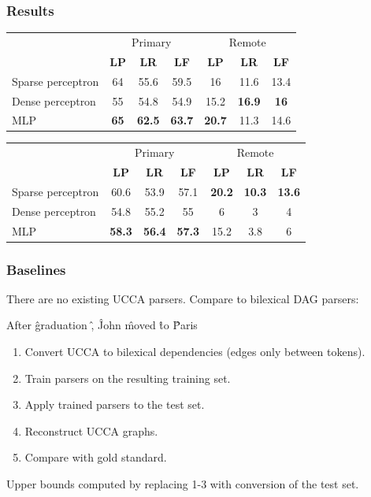 \documentclass[t]{beamer}
\begin{document}
\begin{frame}
\frametitle{Results}
\begin{center}
	\begin{tabular}{l|ccc|ccc}
	& \multicolumn{3}{c|}{Primary} & \multicolumn{3}{c}{Remote} \\
	& \textbf{LP} & \textbf{LR} & \textbf{LF} & \textbf{LP} & \textbf{LR} & \textbf{LF} \\
	\hline
	Sparse perceptron
	& 64 & 55.6 & 59.5 & 16 & 11.6 & 13.4 \\
	Dense perceptron
	& 55 & 54.8 & 54.9 & 15.2 & \bf 16.9 & \bf 16 \\
	MLP
	& \bf 65 & \bf 62.5 & \bf 63.7 & \bf 20.7 & 11.3 & 14.6
	\end{tabular}
	
	\vfill
	\pause
	\begin{tabular}{l|ccc|ccc}
	& \multicolumn{3}{c|}{Primary} & \multicolumn{3}{c}{Remote} \\
	& \textbf{LP} & \textbf{LR} & \textbf{LF} & \textbf{LP} & \textbf{LR} & \textbf{LF} \\
	\hline
	Sparse perceptron
	& 60.6 & 53.9 & 57.1 & \bf 20.2 & \bf 10.3 & \bf 13.6 \\
	Dense perceptron
	& 54.8 & 55.2 & 55 & 6 & 3 & 4 \\
	MLP
	& \bf 58.3 & \bf 56.4 & \bf 57.3 & 15.2 & 3.8 & 6
	\end{tabular}
\end{center}
\end{frame}

\begin{frame}
\frametitle{Baselines}
There are no existing UCCA parsers. Compare to bilexical DAG parsers:
\begin{center}
	\begin{dependency}[theme = simple]
	\begin{deptext}[column sep=.7em,ampersand replacement=\^]
	After \^ graduation \^ , \^ John \^ moved \^ to \^ Paris \\
	\end{deptext}
	\end{dependency}
\end{center}

\vfill
\pause
\begin{enumerate}
 \item Convert UCCA to bilexical dependencies (edges only between tokens).
 \item Train parsers on the resulting training set.
 \item Apply trained parsers to the test set.
 \item Reconstruct UCCA graphs.
 \item Compare with gold standard.
\end{enumerate}

Upper bounds computed by replacing 1-3 with conversion of the test set.
\end{frame}
\end{document}
